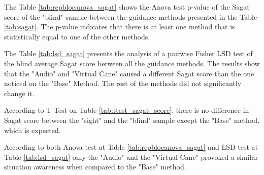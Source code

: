 The Table \ref{tab:repblocanova_sagat} shows the Anova test p-value of the Sagat score of the "blind" sample between the guidance methods presented in the Table \ref{tab:sagat}. The p-value indicates that there is at least one method that is statistically equal to one of the other methods.



The Table \ref{tab:lsd_sagat} presents the analysis of a pairwise Fisher LSD test of the blind average Sagat score between all the guidance methods. The results show that the "Audio" and "Virtual Cane" caused a different Sagat score than the one noticed on the "Base" Method. The rest of the methods did not significantly change it.



According to T-Test on Table \ref{tab:ttest_sagat_score}, there is no difference in Sagat score between the "sight" and the "blind" sample except the "Base" method, which is expected.

According to both Anova test at Table \ref{tab:repblocanova_sagat} and LSD test at Table \ref{tab:lsd_sagat} only the "Audio"  and the "Virtual Cane" provoked a similar situation awareness when compared to the "Base" method.

\FloatBarrier